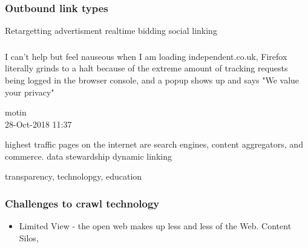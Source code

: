\documentclass[aspectratio=169]{beamer}
\newcommand\blfootnote[1]{%
  \begingroup
  \renewcommand\thefootnote{}\footnote{#1}%
  \addtocounter{footnote}{-1}%
  \endgroup
}
\begin{document}
\begin{frame}
\frametitle{Outbound link types}
Retargetting
advertisment
realtime bidding
social linking

\end{frame}

\begin{frame}
\frametitle{}
\epigraph{I can't help but feel nauseous when I am loading independent.co.uk, Firefox literally grinds to a halt because of the extreme amount of tracking requests being logged in the browser console, and a popup shows up and says "We value your privacy"}{motin \\
28-Oct-2018 11:37}
\end{frame}


\begin{frame}
highest traffic pages on the internet are search engines, content aggregators, and commerce.
data stewardship
dynamic linking
\end{frame}

\begin{frame}
transparency, technolopgy, education


\end{frame}

\begin{frame}
\frametitle{Challenges to crawl technology}
\begin{itemize}
\item{Limited View - the open web makes up less and less of the Web. Content Silos, }
\end{itemize}
\end{frame}


{
%
\begin{frame}

\end{frame}
}
\end{document}
